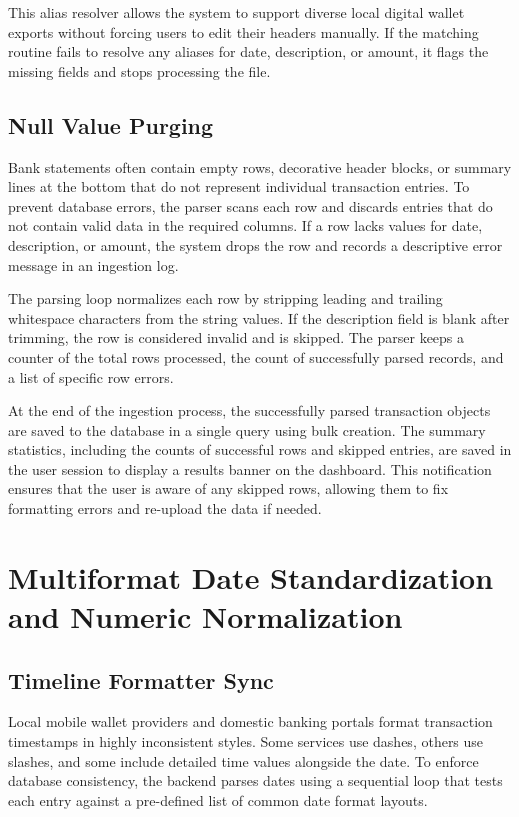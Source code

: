 This alias resolver allows the system to support diverse local digital wallet exports without forcing users to edit their headers manually. If the matching routine fails to resolve any aliases for date, description, or amount, it flags the missing fields and stops processing the file.

\subsection{Null Value Purging}
Bank statements often contain empty rows, decorative header blocks, or summary lines at the bottom that do not represent individual transaction entries. To prevent database errors, the parser scans each row and discards entries that do not contain valid data in the required columns. If a row lacks values for date, description, or amount, the system drops the row and records a descriptive error message in an ingestion log.

The parsing loop normalizes each row by stripping leading and trailing whitespace characters from the string values. If the description field is blank after trimming, the row is considered invalid and is skipped. The parser keeps a counter of the total rows processed, the count of successfully parsed records, and a list of specific row errors.

At the end of the ingestion process, the successfully parsed transaction objects are saved to the database in a single query using bulk creation. The summary statistics, including the counts of successful rows and skipped entries, are saved in the user session to display a results banner on the dashboard. This notification ensures that the user is aware of any skipped rows, allowing them to fix formatting errors and re-upload the data if needed.

\section{Multiformat Date Standardization and Numeric Normalization}
\subsection{Timeline Formatter Sync}
Local mobile wallet providers and domestic banking portals format transaction timestamps in highly inconsistent styles. Some services use dashes, others use slashes, and some include detailed time values alongside the date. To enforce database consistency, the backend parses dates using a sequential loop that tests each entry against a pre-defined list of common date format layouts.

